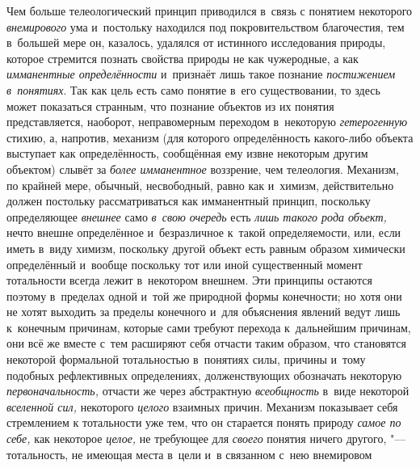 Чем больше телеологический принцип приводился в~связь с
понятием некоторого {\em внемирового}
ума и~постольку находился под покровительством благочестия,
тем в~большей мере он, казалось, удалялся от истинного исследования
природы, которое стремится познать свойства природы не как чужеродные, а
как {\em имманентные определённости}
и~признаёт лишь такое познание
{\em постижением в~понятиях}.
Так как цель есть само понятие в~его существовании, то здесь
может показаться странным, что познание объектов из их понятия
представляется, наоборот, неправомерным переходом в~некоторую
{\em гетерогенную}
стихию, а, напротив, механизм (для которого определённость
какого-либо объекта выступает как определённость, сообщённая ему извне
некоторым другим объектом) слывёт за
{\em более имманентное}
воззрение, чем телеология. Механизм, по крайней мере,
обычный, несвободный, равно как и~химизм, действительно должен постольку
рассматриваться как имманентный принцип, поскольку определяющее
{\em внешнее} само
{\em в~свою очередь} есть
{\em лишь такого рода объект,}
нечто внешне определённое и~безразличное к~такой
определяемости, или, если иметь в~виду химизм, поскольку другой объект есть
равным образом химически определённый и~вообще поскольку тот или иной
существенный момент тотальности всегда лежит в~некотором внешнем. Эти
принципы остаются поэтому в~пределах одной и~той же природной формы
конечности; но хотя они не хотят выходить за пределы
конечного и~для объяснения явлений ведут лишь к~конечным причинам, которые
сами требуют перехода к~дальнейшим причинам, они всё же вместе с~тем
расширяют себя отчасти таким образом, что становятся некоторой формальной
тотальностью в~понятиях силы, причины и~тому подобных рефлективных
определениях, долженствующих обозначать некоторую
{\em первоначальность,}
отчасти же через абстрактную
{\em всеобщность} в~виде
некоторой {\em вселенной сил,}
некоторого {\em целого}
взаимных причин. Механизм показывает себя стремлением к
тотальности уже тем, что он старается понять природу
{\em самое по себе,} как
некоторое {\em целое,} не
требующее для {\em своего}
понятия ничего другого, "--- тотальность, не
имеющая места в~цели и~в связанном с~нею внемировом

